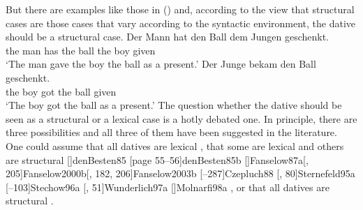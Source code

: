 But there are examples like those in () and, according to the view that structural cases are
those cases that vary according to the syntactic environment, the dative should be a structural case.
\eal
\ex 
\gll Der Mann  hat   den Ball dem Jungen geschenkt.\\
     the man   has   the ball the boy given\\
\glt `The man gave the boy the ball as a present.'
\ex 
\gll Der Junge bekam den Ball geschenkt.\\
     the boy   got   the ball given\\   
\glt `The boy got the ball as a present.'
\zl
The question whether the dative should be seen as a structural or a lexical case is a hotly debated
one. In principle, there are three possibilities and all three of them have been suggested in the
literature. One could assume that all datives are lexical 
\parencites{Haider85b}%
[]{Haider86}[, 217, 228]{HM94a}%
{Mueller99a,Mueller2001a}[]{Mueller2003e}%
[]{Scherpenisse86a}%
[, 291]{Pollard94a}%
[]{Meurers99b}[]{VS98a}[]{Abraham95a-u}%
[]{McIntyre2006a}, 
that some are lexical and others are structural 
\parencites
{Wegener85a}%
{Wegener90}%
[]{denBesten85}%
[page 55--56]{denBesten85b}%
[]{Fanselow87a}[, 205]{Fanselow2000b}[, 182, 206]{Fanselow2003b}%
[--287]{Czepluch88}%
[, 80]{Sternefeld95a}%
[--103]{Stechow96a}%
[, 51]{Wunderlich97a}%
[]{Molnarfi98a}%
, or that all datives are structural 
\parencites[]{Sternefeld95a}%
[, 205--206]{Ryu97a}%
[--97]{Gunkel2003b}.%

